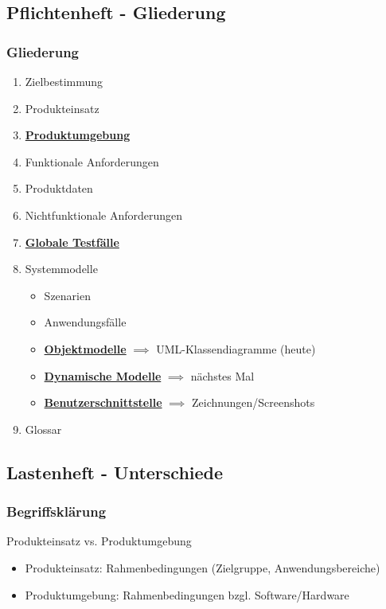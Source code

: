 \documentclass[18pt]{beamer}
\begin{document}
	\subsection{Pflichtenheft - Gliederung}
	\begin{frame}
		\frametitle{Gliederung}
		\pause
		\begin{enumerate}
			\item Zielbestimmung  
			\item Produkteinsatz 
			\item \underline{\textbf{Produktumgebung}} 
			\item Funktionale Anforderungen 
			\item Produktdaten 
			\item Nichtfunktionale Anforderungen 
			\item \underline{\textbf{Globale Testfälle}} 
			\item Systemmodelle
			\begin{itemize}
				\item Szenarien
				\item Anwendungsfälle
				\item \underline{\textbf{Objektmodelle}} $\implies$ UML-Klassendiagramme (heute)
				\item \underline{\textbf{Dynamische Modelle}} $\implies$ nächstes Mal
				\item \underline{\textbf{Benutzerschnittstelle}} $\implies$ Zeichnungen/Screenshots
			\end{itemize}
			\item Glossar 
		\end{enumerate}
	\end{frame}
	
	\subsection{Lastenheft - Unterschiede}
	\begin{frame}
		\frametitle{Begriffsklärung}
		\begin{block}{Produkteinsatz vs. Produktumgebung}
			\pause
			\begin{itemize}
				\item Produkteinsatz: Rahmenbedingungen (Zielgruppe, Anwendungsbereiche)
				\item Produktumgebung: Rahmenbedingungen bzgl. Software/Hardware
			\end{itemize}
		\end{block}
	\end{frame}
	
\end{document}
